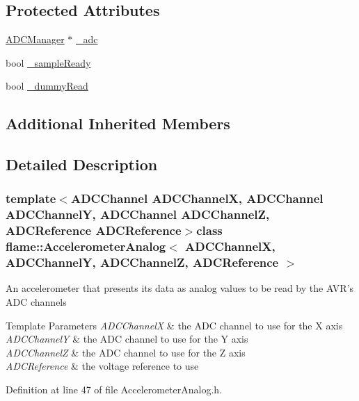 \subsection*{Protected Attributes}
\begin{DoxyCompactItemize}
\item 
\hyperlink{classflame_1_1_a_d_c_manager}{A\-D\-C\-Manager} $\ast$ \hyperlink{classflame_1_1_accelerometer_analog_ac3dda0476fa8c65185f8d6620225b0a3}{\-\_\-adc}
\item 
bool \hyperlink{classflame_1_1_accelerometer_analog_a89b9682e1c2817adeb48ab91fc25c507}{\-\_\-sample\-Ready}
\item 
bool \hyperlink{classflame_1_1_accelerometer_analog_a16e72bdbf27a8f4ba5b5ed068620d84c}{\-\_\-dummy\-Read}
\end{DoxyCompactItemize}
\subsection*{Additional Inherited Members}


\subsection{Detailed Description}
\subsubsection*{template$<$A\-D\-C\-Channel A\-D\-C\-Channel\-X, A\-D\-C\-Channel A\-D\-C\-Channel\-Y, A\-D\-C\-Channel A\-D\-C\-Channel\-Z, A\-D\-C\-Reference A\-D\-C\-Reference$>$class flame\-::\-Accelerometer\-Analog$<$ A\-D\-C\-Channel\-X, A\-D\-C\-Channel\-Y, A\-D\-C\-Channel\-Z, A\-D\-C\-Reference $>$}

An accelerometer that presents its data as analog values to be read by the A\-V\-R's A\-D\-C channels 
\begin{DoxyTemplParams}{Template Parameters}
{\em A\-D\-C\-Channel\-X} & the A\-D\-C channel to use for the X axis \\
\hline
{\em A\-D\-C\-Channel\-Y} & the A\-D\-C channel to use for the Y axis \\
\hline
{\em A\-D\-C\-Channel\-Z} & the A\-D\-C channel to use for the Z axis \\
\hline
{\em A\-D\-C\-Reference} & the voltage reference to use \\
\hline
\end{DoxyTemplParams}


Definition at line 47 of file Accelerometer\-Analog.\-h.



